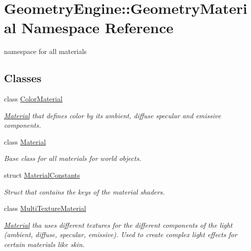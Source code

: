 \hypertarget{namespace_geometry_engine_1_1_geometry_material}{}\section{Geometry\+Engine\+::Geometry\+Material Namespace Reference}
\label{namespace_geometry_engine_1_1_geometry_material}


namespace for all materials  


\subsection*{Classes}
\begin{DoxyCompactItemize}
\item 
class \mbox{\hyperlink{class_geometry_engine_1_1_geometry_material_1_1_color_material}{Color\+Material}}
\begin{DoxyCompactList}\small\item\em \mbox{\hyperlink{class_geometry_engine_1_1_geometry_material_1_1_material}{Material}} that defines color by its ambient, diffuse specular and emissive components. \end{DoxyCompactList}\item 
class \mbox{\hyperlink{class_geometry_engine_1_1_geometry_material_1_1_material}{Material}}
\begin{DoxyCompactList}\small\item\em Base class for all materials for world objects. \end{DoxyCompactList}\item 
struct \mbox{\hyperlink{struct_geometry_engine_1_1_geometry_material_1_1_material_constants}{Material\+Constants}}
\begin{DoxyCompactList}\small\item\em Struct that contains the keys of the material shaders. \end{DoxyCompactList}\item 
class \mbox{\hyperlink{class_geometry_engine_1_1_geometry_material_1_1_multi_texture_material}{Multi\+Texture\+Material}}
\begin{DoxyCompactList}\small\item\em \mbox{\hyperlink{class_geometry_engine_1_1_geometry_material_1_1_material}{Material}} tha uses different textures for the different components of the light (ambient, diffuse, specular, emissive). Used to create complex light effects for certain materials like skin. \end{DoxyCompactList}\item 

\end{DoxyCompactItemize}
